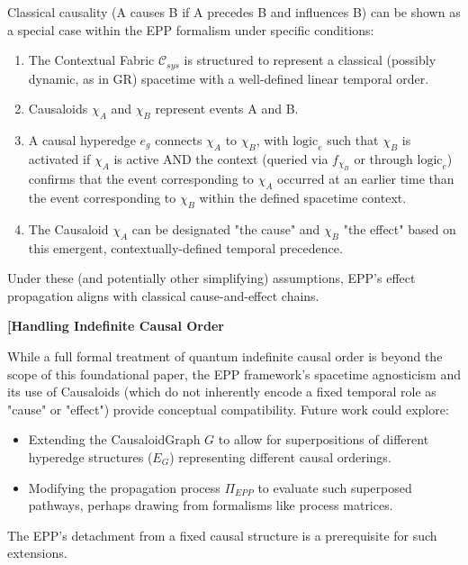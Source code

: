         Classical causality (A causes B if A precedes B and influences B) can be shown as a special case within the EPP formalism under specific conditions:
        \begin{enumerate}
            \item The Contextual Fabric \(\mathcal{C}_{sys}\) is structured to represent a classical (possibly dynamic, as in GR) spacetime with a well-defined linear temporal order.
            \item Causaloids \(\chi_A\) and \(\chi_B\) represent events A and B.
            \item A causal hyperedge \(e_g\) connects \(\chi_A\) to \(\chi_B\), with \(\text{logic}_e\) such that \(\chi_B\) is activated if \(\chi_A\) is active AND the context (queried via \(f_{\chi_B}\) or through \(\text{logic}_e\)) confirms that the event corresponding to \(\chi_A\) occurred at an earlier time than the event corresponding to \(\chi_B\) within the defined spacetime context.
            \item The Causaloid \(\chi_A\) can be designated "the cause" and \(\chi_B\) "the effect" based on this emergent, contextually-defined temporal precedence.
        \end{enumerate}
        Under these (and potentially other simplifying) assumptions, EPP's effect propagation aligns with classical cause-and-effect chains.


\textbf{[Handling Indefinite Causal Order}
        
        While a full formal treatment of quantum indefinite causal order is beyond the scope of this foundational paper, the EPP framework's spacetime agnosticism and its use of Causaloids (which do not inherently encode a fixed temporal role as "cause" or "effect") provide conceptual compatibility. Future work could explore:
        \begin{itemize}
            \item Extending the CausaloidGraph \(G\) to allow for superpositions of different hyperedge structures (\(E_G\)) representing different causal orderings.
            \item Modifying the propagation process \(\Pi_{EPP}\) to evaluate such superposed pathways, perhaps drawing from formalisms like process matrices.
        \end{itemize}
        The EPP's detachment from a fixed causal structure is a prerequisite for such extensions.



